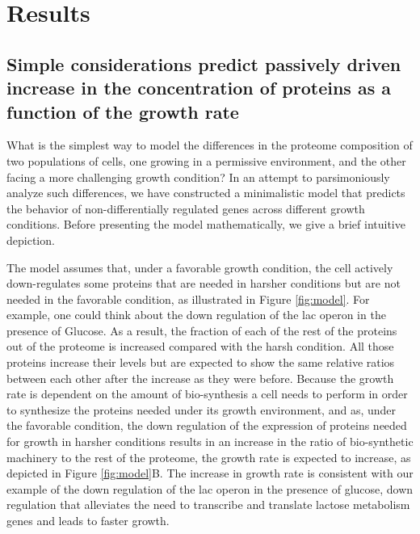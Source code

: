 \documentclass[a4paper]{article}
\begin{document}
\section{Results}

\subsection{Simple considerations predict passively driven increase in the concentration of proteins as a function of the growth rate}
What is the simplest way to model the differences in the proteome composition of two populations of cells, one growing in a permissive environment, and the other facing a more challenging growth condition?
In an attempt to parsimoniously analyze such differences, we have constructed a minimalistic model that predicts the behavior of non-differentially regulated genes across different growth conditions.
Before presenting the model mathematically, we give a brief intuitive depiction.

The model assumes that, under a favorable growth condition, the cell actively down-regulates some proteins that are needed in harsher conditions but are not needed in the favorable condition, as illustrated in Figure \ref{fig:model}.
For example, one could think about the down regulation of the lac operon in the presence of Glucose. 
As a result, the fraction of each of the rest of the proteins out of the proteome is increased compared with the harsh condition.
All those proteins increase their levels but are expected to show the same relative ratios between each other after the increase as they were before. 
Because the growth rate is dependent on the amount of bio-synthesis a cell needs to perform in order to synthesize the proteins needed under its growth environment, and as, under the favorable condition, the down regulation of the expression of proteins needed for growth in harsher conditions results in an increase in the ratio of bio-synthetic machinery to the rest of the proteome, the growth rate is expected to increase, as  depicted in Figure \ref{fig:model}B.
The increase in growth rate is consistent with our example of the down regulation of the lac operon in the presence of glucose, down regulation that alleviates the need to transcribe and translate lactose metabolism genes and leads to faster growth.
\end{document}
